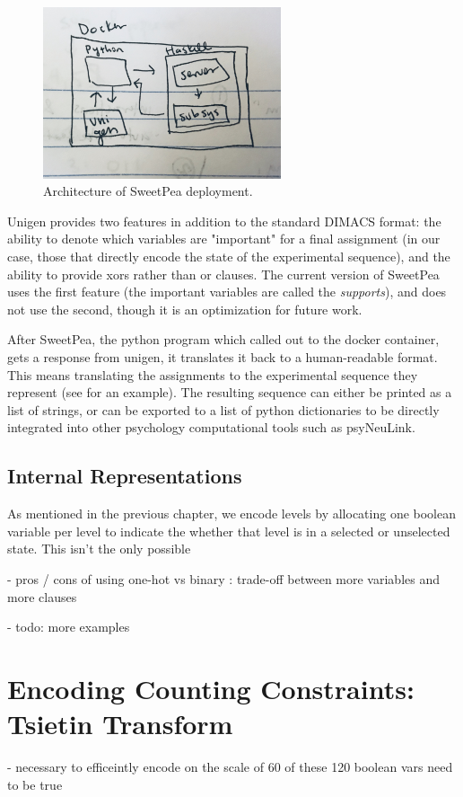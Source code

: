 \begin{figure}[t]
    \centerline{\includegraphics[origin=c,width=7cm]{fig_architecture}}
    \caption{Architecture of SweetPea deployment.}%
    \label{fig:fig_architecture}%
\end{figure}

Unigen provides two features in addition to the standard DIMACS format: the ability to denote which variables are "important" for a final assignment (in our case, those that directly encode the state of the experimental sequence), and the ability to provide xors rather than or clauses. The current version of SweetPea uses the first feature (the important variables are called the \emph{supports}), and does not use the second, though it is an optimization for future work.

After SweetPea, the python program which called out to the docker container, gets a response from unigen, it translates it back to a human-readable format. This means translating the assignments to the experimental sequence they represent (see  for an example). The resulting sequence can either be printed as a list of strings, or can be exported to a list of python dictionaries to be directly integrated into other psychology computational tools such as psyNeuLink.

\subsection{Internal Representations}

As mentioned in the previous chapter, we encode levels by allocating one boolean variable per level to indicate the whether that level is in a selected or unselected state. This isn't the only possible


- pros / cons of using one-hot vs binary : trade-off between more variables and more clauses

- todo: more examples

\section{Encoding Counting Constraints: Tsietin Transform}
- necessary to efficeintly encode on the scale of 60 of these 120 boolean vars need to be true

